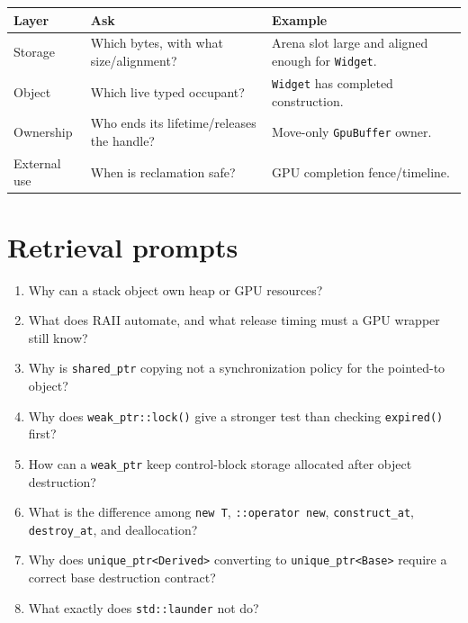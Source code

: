 {\def\LTcaptype{none} %
\begin{longtable}[]{@{}
  >{\raggedright\arraybackslash}p{}
  >{\raggedright\arraybackslash}p{}
  >{\raggedright\arraybackslash}p{}@{}}
\toprule\noalign{}
\begin{minipage}[b]{\linewidth}\raggedright
Layer
\end{minipage} & \begin{minipage}[b]{\linewidth}\raggedright
Ask
\end{minipage} & \begin{minipage}[b]{\linewidth}\raggedright
Example
\end{minipage} \\
\midrule\noalign{}
\endhead
\bottomrule\noalign{}
\endlastfoot
Storage & Which bytes, with what size/alignment? & Arena slot large and aligned enough for \texttt{Widget}. \\
Object & Which live typed occupant? & \texttt{Widget} has completed construction. \\
Ownership & Who ends its lifetime/releases the handle? & Move-only \texttt{GpuBuffer} owner. \\
External use & When is reclamation safe? & GPU completion fence/timeline. \\
\end{longtable}
}

\section{Retrieval prompts}\label{appendix-960160274237-retrieval-prompts}

\begin{enumerate}
\def\labelenumi{\arabic{enumi}.}
\tightlist
\item
  Why can a stack object own heap or GPU resources?
\item
  What does RAII automate, and what release timing must a GPU wrapper still know?
\item
  Why is \texttt{shared\_ptr} copying not a synchronization policy for the pointed-to object?
\item
  Why does \texttt{weak\_ptr::lock()} give a stronger test than checking \texttt{expired()} first?
\item
  How can a \texttt{weak\_ptr} keep control-block storage allocated after object destruction?
\item
  What is the difference among \texttt{new\ T}, \texttt{::operator\ new}, \texttt{construct\_at}, \texttt{destroy\_at}, and deallocation?
\item
  Why does \texttt{unique\_ptr\textless{}Derived\textgreater{}} converting to \texttt{unique\_ptr\textless{}Base\textgreater{}} require a correct base destruction contract?
\item
  What exactly does \texttt{std::launder} not do?
\end{enumerate}

